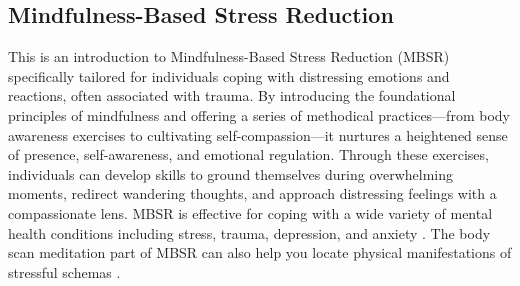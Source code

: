 \documentclass[12pt,letterpaper]{article}
\begin{document}
\subsection{Mindfulness-Based Stress Reduction}
\label{MBSR}
This is an introduction to Mindfulness-Based Stress Reduction (MBSR) specifically tailored for individuals coping with distressing emotions and reactions, often associated with trauma. By introducing the foundational principles of mindfulness and offering a series of methodical practices—from body awareness exercises to cultivating self-compassion—it nurtures a heightened sense of presence, self-awareness, and emotional regulation. Through these exercises, individuals can develop skills to ground themselves during overwhelming moments, redirect wandering thoughts, and approach distressing feelings with a compassionate lens. MBSR is effective for coping with a wide variety of mental health conditions including stress, trauma, depression, and anxiety \cite{liuMBSR,khouryMBSR}. The body scan meditation part of MBSR can also help you locate physical manifestations of stressful schemas \cite{vanderKolkBody}. 
\end{document}
